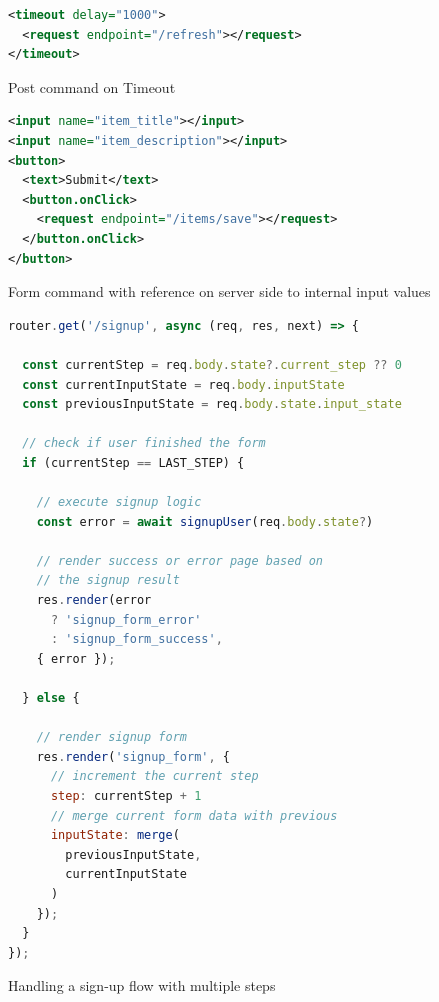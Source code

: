 \begin{figure}
\begin{minipage}{\linewidth}
\begin{lstlisting}[language=xml]
<timeout delay="1000">
  <request endpoint="/refresh"></request>
</timeout>
\end{lstlisting}
\end{minipage}
\caption{Post command on Timeout}%
\label{fig:ex_cmd_post_timeout}%
\end{figure}

\begin{figure}
\begin{minipage}{\linewidth}
\begin{lstlisting}[language=xml]
<input name="item_title"></input>
<input name="item_description"></input>
<button>
  <text>Submit</text>
  <button.onClick>
    <request endpoint="/items/save"></request>
  </button.onClick>
</button>
\end{lstlisting}
\end{minipage}
\caption{Form command with reference on server side to internal input values}%
\label{fig:ex_cmd_form}%
\end{figure}

\begin{figure}
\begin{minipage}{\linewidth}
\begin{lstlisting}[language=javascript]
router.get('/signup', async (req, res, next) => {
  
  const currentStep = req.body.state?.current_step ?? 0
  const currentInputState = req.body.inputState
  const previousInputState = req.body.state.input_state
  
  // check if user finished the form
  if (currentStep == LAST_STEP) {
    
    // execute signup logic
    const error = await signupUser(req.body.state?)
    
    // render success or error page based on
    // the signup result
    res.render(error
      ? 'signup_form_error'
      : 'signup_form_success',
    { error });
  
  } else {
    
    // render signup form
    res.render('signup_form', {
      // increment the current step
      step: currentStep + 1
      // merge current form data with previous
      inputState: merge(
        previousInputState,
        currentInputState
      )
    });
  }
});
\end{lstlisting}
\end{minipage}
\caption{Handling a sign-up flow with multiple steps}%
\label{fig:state_signup_progress_js}%
\end{figure}

